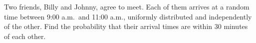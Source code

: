 Two friends, Billy and Johnny, agree to meet. Each of them arrives at a random time between 9:00 a.m.\ and 11:00 a.m., uniformly distributed and independently of the other. Find the probability that their arrival times are within $30$ minutes of each other.
